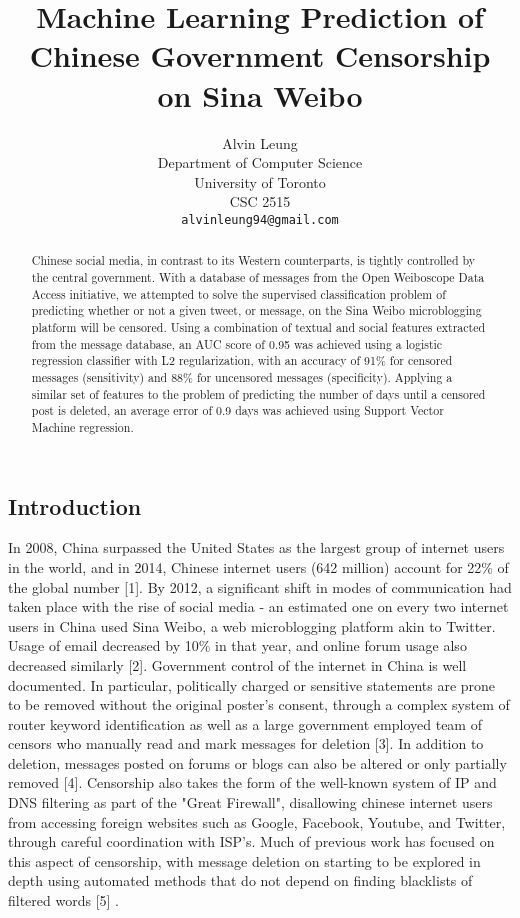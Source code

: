 \documentclass{article} %
\title{Machine Learning Prediction of Chinese Government Censorship on Sina Weibo}
\author{
Alvin Leung \\
Department of Computer Science\\
University of Toronto\\
CSC 2515\\
\texttt{alvinleung94@gmail.com} \\
}
\begin{document}
\begin{CJK*}{UTF8}{gbsn}

\maketitle

\begin{abstract}

Chinese social media, in contrast to its Western counterparts, is tightly controlled by the central government. With a database of messages from the Open Weiboscope Data Access initiative, we attempted to solve the supervised classification problem of predicting whether or not a given tweet, or message, on the Sina Weibo microblogging platform will be censored. Using a combination of textual and social features extracted from the message database, an AUC score of 0.95 was achieved using a logistic regression classifier with L2 regularization, with an accuracy of 91\% for censored messages (sensitivity) and 88\% for uncensored messages (specificity). Applying a similar set of features to the problem of predicting the number of days until a censored post is deleted, an average error of 0.9 days was achieved using Support Vector Machine regression.

\end{abstract}

\section{Introduction}
In 2008, China surpassed the United States as the largest group of internet users in the world, and in 2014, Chinese internet users (642 million) account for 22\% of the global number [1]. By 2012, a significant shift in modes of communication had taken place with the rise of social media - an estimated one on every two internet users in China used Sina Weibo, a web microblogging platform akin to Twitter. Usage of email decreased by 10\% in that year, and online forum usage also decreased similarly [2]. Government control of the internet in China is well documented. In particular, politically charged or sensitive statements are prone to be removed without the original poster's consent, through a complex system of router keyword identification as well as a large government employed team of censors who manually read and mark messages for deletion [3]. In addition to deletion, messages posted on forums or blogs can also be altered or only partially removed [4]. Censorship also takes the form of the well-known system of IP and DNS filtering as part of the "Great Firewall", disallowing chinese internet users from accessing foreign websites such as Google, Facebook, Youtube, and Twitter, through careful coordination with ISP's. Much of previous work has focused on this aspect of censorship, with message deletion on starting to be explored in depth using automated methods that do not depend on finding blacklists of filtered words [5] .


\end{CJK*}
\end{document}

